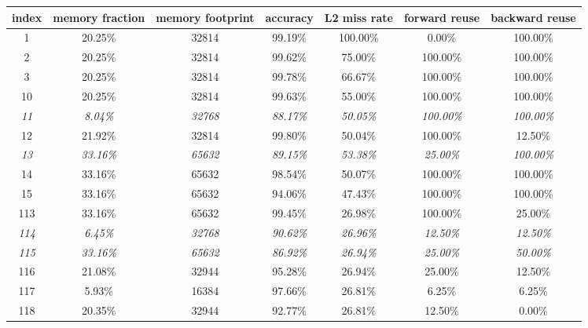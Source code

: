 \begin{tabular}{|c|c|c|c|c|c|c|}
  \hline
    index & memory fraction & memory footprint & accuracy & L2 miss rate & forward reuse & backward reuse \\
  \hline
  \hline
    1 & 20.25\% & 32814 & 99.19\% & 100.00\% & 0.00\% & 100.00\% \\
    2 & 20.25\% & 32814 & 99.62\% & 75.00\% & 100.00\% & 100.00\% \\
    3 & 20.25\% & 32814 & 99.78\% & 66.67\% & 100.00\% & 100.00\% \\
  \hline
  \hline
    10 & 20.25\% & 32814 & 99.63\% & 55.00\% & 100.00\% & 100.00\% \\
    \textit{11} & \textit{8.04\%} & \textit{32768} & \textit{88.17\%} & \textit{50.05\%} & \textit{100.00\%} & \textit{100.00\%} \\
    12 & 21.92\% & 32814 & 99.80\% & 50.04\% & 100.00\% & 12.50\% \\
    \textit{13} & \textit{33.16\%} & \textit{65632} & \textit{89.15\%} & \textit{53.38\%} & \textit{25.00\%} & \textit{100.00\%} \\
    14 & 33.16\% & 65632 & 98.54\% & 50.07\% & 100.00\% & 100.00\% \\
    15 & 33.16\% & 65632 & 94.06\% & 47.43\% & 100.00\% & 100.00\% \\
  \hline
  \hline
    113 & 33.16\% & 65632 & 99.45\% & 26.98\% & 100.00\% & 25.00\% \\
    \textit{114} & \textit{6.45\%} & \textit{32768} & \textit{90.62\%} & \textit{26.96\%} & \textit{12.50\%} & \textit{12.50\%} \\
    \textit{115} & \textit{33.16\%} & \textit{65632} & \textit{86.92\%} & \textit{26.94\%} & \textit{25.00\%} & \textit{50.00\%} \\
    116 & 21.08\% & 32944 & 95.28\% & 26.94\% & 25.00\% & 12.50\% \\
    117 & 5.93\% & 16384 & 97.66\% & 26.81\% & 6.25\% & 6.25\% \\
    118 & 20.35\% & 32944 & 92.77\% & 26.81\% & 12.50\% & 0.00\% \\
  \hline
\end{tabular}
